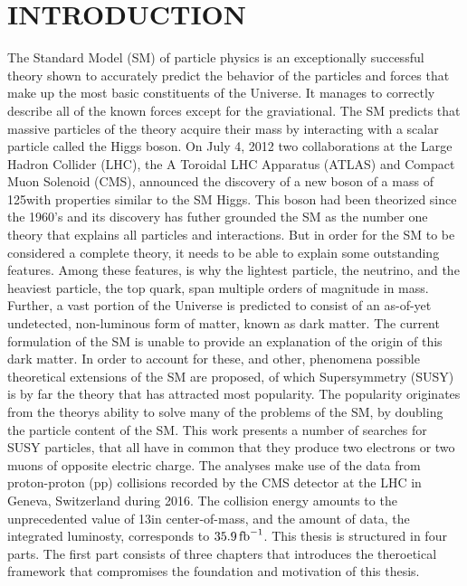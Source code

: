 \chapter{INTRODUCTION} \label{intro}
\noindent\justify
The Standard Model (SM) of particle physics is an exceptionally successful theory shown to accurately predict the behavior of the particles and forces that make up the most basic constituents of the Universe. 
It manages to correctly describe all of the known forces except for the graviational. 
The SM predicts that massive particles of the theory acquire their mass by interacting with a scalar particle called the Higgs boson. 
On July 4, 2012 two collaborations at the Large Hadron Collider (LHC), the A Toroidal LHC Apparatus (ATLAS) and Compact Muon Solenoid (CMS), announced the discovery of a new boson of a mass of 125\GeV with properties similar to the SM Higgs. 
This boson had been theorized since the 1960's and its discovery has futher grounded the SM as the number one theory that explains all particles and interactions. 
\newpara
\noindent\justify
But in order for the SM to be considered a complete theory, it needs to be able to explain some outstanding features. 
Among these features, is why the lightest particle, the neutrino, and the heaviest particle, the top quark, span multiple orders of magnitude in mass. 
Further, a vast portion of the Universe is predicted to consist of an as-of-yet undetected, non-luminous form of matter, known as dark matter. 
The current formulation of the SM is unable to provide an explanation of the origin of this dark matter.  
In order to account for these, and other, phenomena possible theoretical extensions of the SM are proposed, of which Supersymmetry (SUSY) is by far the theory that has attracted most popularity. 
The popularity originates from the theorys ability to solve many of the problems of the SM, by doubling the particle content of the SM. 
\newpara
\noindent\justify
This work presents a number of searches for SUSY particles, that all have in common that they produce two electrons or two muons of opposite electric charge. 
The analyses make use of the data from proton-proton (pp) collisions recorded by the CMS detector at the LHC in Geneva, Switzerland during 2016. 
The collision energy amounts to the unprecedented value of 13\TeV in center-of-mass, and the amount of data, the integrated luminosty, corresponds to $35.9\mbox{\ensuremath{\,\text{fb}^\text{$-$1}}}$.   
\newpara
\noindent\justify
This thesis is structured in four parts. 
The first part consists of three chapters that introduces the theroetical framework that compromises the foundation and motivation of this thesis. 
